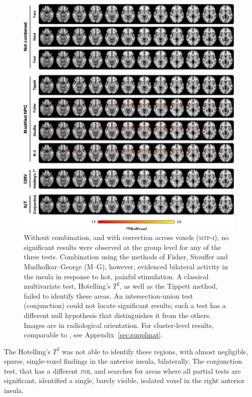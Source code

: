 \begin{figure}[p]
\begin{center}
\centerline{\includegraphics{images/pain.eps}}
\end{center}
\vspace{-9mm}
\caption[Results of the example pain study.]{Without combination, and with correction across voxels (\textsc{mtp-i}), no significant results were observed at the group level for any of the three tests. Combination using the methods of Fisher, Stouffer and Mudholkar--George (M--G), however, evidenced bilateral activity in the insula in response to hot, painful stimulation. A classical multivariate test, Hotelling's $T^2$, as well as the Tippett method, failed to identify these areas. An intersection-union test (conjunction) could not locate significant results; such a test has a different null hypothesis that distinguishes it from the others. Images are in radiological orientation. For cluster-level results, comparable to \citet{Brooks2005}, see Appendix~\ref{sec:supplmat}.}
\label{fig:comb:pain}
\end{figure}

The Hotelling's $T^2$ was not able to identify these regions, with almost negligible, sparse, single-voxel findings in the anterior insula, bilaterally. The conjunction test, that has a different \textsc{jnh}, and searches for areas where all partial tests are significant, identified a single, barely visible, isolated voxel in the right anterior insula.

